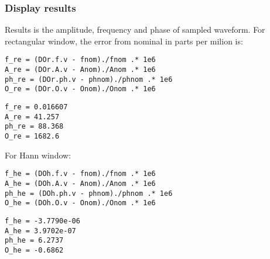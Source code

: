 {}
\subsubsection*{Display results}



Results is the amplitude, frequency and phase of sampled waveform. For rectangular window, the
error from nominal in parts per milion is:

\begin{lstlisting}
f_re = (DOr.f.v - fnom)./fnom .* 1e6
A_re = (DOr.A.v - Anom)./Anom .* 1e6
ph_re = (DOr.ph.v - phnom)./phnom .* 1e6
O_re = (DOr.O.v - Onom)./Onom .* 1e6
\end{lstlisting}
\begin{lstlisting}[language={},xleftmargin=5pt,frame=none]
f_re = 0.016607
A_re = 41.257
ph_re = 88.368
O_re = 1682.6

\end{lstlisting}


For Hann window:

\begin{lstlisting}
f_he = (DOh.f.v - fnom)./fnom .* 1e6
A_he = (DOh.A.v - Anom)./Anom .* 1e6
ph_he = (DOh.ph.v - phnom)./phnom .* 1e6
O_he = (DOh.O.v - Onom)./Onom .* 1e6
\end{lstlisting}
\begin{lstlisting}[language={},xleftmargin=5pt,frame=none]
f_he = -3.7790e-06
A_he = 3.9702e-07
ph_he = 6.2737
O_he = -0.6862

\end{lstlisting}


\stopcontents[localtoc]
